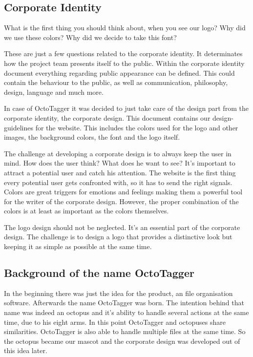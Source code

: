 \subsection{Corporate Identity}

What is the first thing you should think about, when you see our logo? Why did we use these colors? Why did we decide to take this font? 

These are just a few questions related to the corporate identity. It determinates how the project team presents itself to the public. Within the corporate identity document everything regarding public appearance can be defined. This could contain the behaviour to the public, as well as communication, philosophy, design, language and much more. 

In case of OctoTagger it was decided to just take care of the design part from the corporate identity, the corporate design. This document contains our design-guidelines for the website. This includes the colors used for the logo and other images, the background colors, the font and the logo itself. 

The challenge at developing a corporate design is to always keep the user in mind. How does the user think? What does he want to see? It's important to attract a potential user and catch his attention. The website is the first thing every potential user gets confronted with, so it has to send the right signals. Colors are great triggers for emotions and feelings making them a powerful tool for the writer of the corporate design. However, the proper combination of the colors is at least as important as the colors themselves. 

The logo design should not be neglected. It's an essential part of the corporate design. The challenge is to design a logo that provides a distinctive look but keeping it as simple as possible at the same time. 

\subsection{Background of the name OctoTagger}

In the beginning there was just the idea for the product, an file organisation software. Afterwards the name OctoTagger was born. The intention behind that name was indeed an octopus and it's ability to handle several actions at the same time, due to his eight arms. In this point OctoTagger and octopuses share similarities. OctoTagger is also able to handle multiple files at the same time. So the octopus became our mascot and the corporate design was developed out of this idea later. 

